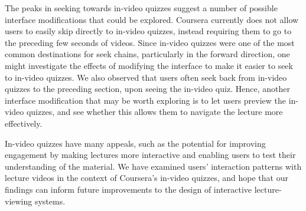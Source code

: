 \documentclass{sigchi}
\begin{document}


The peaks in seeking towards in-video quizzes suggest a number of possible interface modifications that could be explored. Coursera currently does not allow users to easily skip directly to in-video quizzes, instead requiring them to go to the preceding few seconds of videos. Since in-video quizzes were one of the most common destinations for seek chains, particularly in the forward direction, one might investigate the effects of modifying the interface to make it easier to seek to in-video quizzes. We also observed that users often seek back from in-video quizzes to the preceding section, upon seeing the in-video quiz. Hence, another interface modification that may be worth exploring is to let users preview the in-video quizzes, and see whether this allows them to navigate the lecture more effectively. %

In-video quizzes have many appeals, such as the potential for improving engagement by making lectures more interactive and enabling users to test their understanding of the material. We have examined users' interaction patterns with lecture videos in the context of Coursera's in-video quizzes, and hope that our findings can inform future improvements to the design of interactive lecture-viewing systems.



\end{document}
